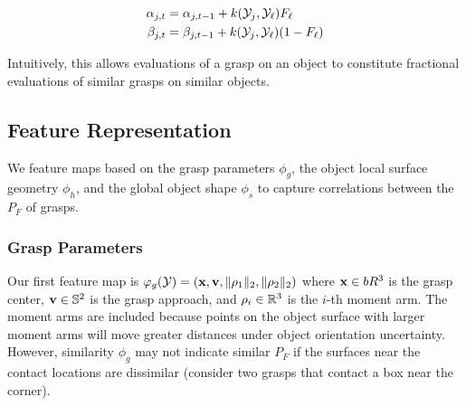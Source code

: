 \vspace{-2ex}
\begin{align}
	\alpha_{j,t} &= \alpha_{j,t-1} + k(\mathcal{Y}_{j}, \mathcal{Y}_{\ell}) F_{\ell} \label{eq:alpha} \\
	\beta_{j,t} &= \beta_{j,t-1} + k(\mathcal{Y}_{j}, \mathcal{Y}_{\ell}) (1 - F_{\ell})\label{eq:beta}
\end{align}

\noindent Intuitively, this allows evaluations of a grasp on an object to constitute fractional evaluations of similar grasps on similar objects.

\subsection{Feature Representation}
We feature maps based on the grasp parameters $\phi_g$, the object local surface geometry $\phi_h$, and the global object shape $\phi_s$ to capture correlations between the $P_F$ of grasps.

\subsubsection{Grasp Parameters}
Our first feature map is $\varphi_{g}(\mathcal{Y}) = (\mathbf{x}, \mathbf{v}, \| \rho_1 \|_2, \| \rho_2 \|_2)$ where $\mathbf{x} \in bR^3$ is the grasp center, $\mathbf{v} \in \mathbb{S}^2$ is the grasp approach, and $\rho_i \in \mathbb{R}^3$ is the $i$-th moment arm.
The moment arms are included because points on the object surface with larger moment arms will move greater distances under object orientation uncertainty.
However, similarity $\phi_g$ may not indicate similar $P_F$ if the surfaces near the contact locations are dissimilar (consider two grasps that contact a box near the corner).


